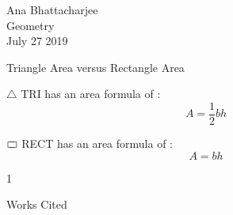 \documentclass[12pt]{article}
\newcommand{\rectangle}{{%
  \ooalign{$\sqsubset\mkern3mu$\cr$\mkern3mu\sqsupset$\cr}%
}}
\newenvironment{workscited}{\newpage \begin{center} Works Cited \end{center}}{\newpage }
\begin{document}
\begin{flushleft}

Ana Bhattacharjee\\
Geometry\\
July 27 2019\\


\begin{center}
Triangle Area versus Rectangle Area
\end{center}


\setlength{\parindent}{0.5in}

$\triangle$ TRI has an area formula of :
\begin{equation}
  A = \frac{1}{2}bh
\end{equation}
\par
$\rectangle$ RECT  has an area formula of :
\begin{equation}
  A = bh
\end{equation}
\begin{center}

\end{center}


\setlength{\parindent}{0.5in}

1

\begin{workscited}


\end{workscited}

\end{flushleft}
\end{document}

